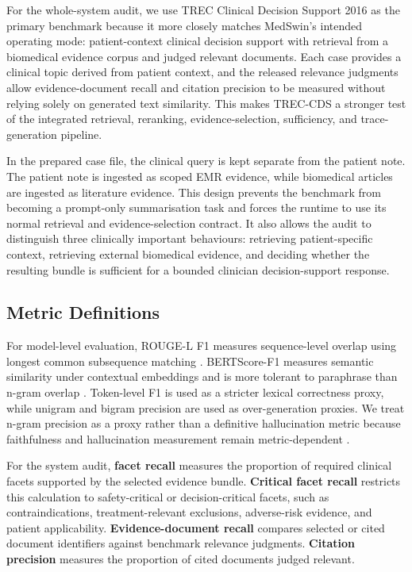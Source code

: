 \documentclass[conference]{IEEEtran}
\begin{document}
For the whole-system audit, we use TREC Clinical Decision Support 2016 as the primary benchmark because it more closely matches MedSwin's intended operating mode: patient-context clinical decision support with retrieval from a biomedical evidence corpus and judged relevant documents. Each case provides a clinical topic derived from patient context, and the released relevance judgments allow evidence-document recall and citation precision to be measured without relying solely on generated text similarity. This makes TREC-CDS a stronger test of the integrated retrieval, reranking, evidence-selection, sufficiency, and trace-generation pipeline.

In the prepared case file, the clinical query is kept separate from the patient note. The patient note is ingested as scoped EMR evidence, while biomedical articles are ingested as literature evidence. This design prevents the benchmark from becoming a prompt-only summarisation task and forces the runtime to use its normal retrieval and evidence-selection contract. It also allows the audit to distinguish three clinically important behaviours: retrieving patient-specific context, retrieving external biomedical evidence, and deciding whether the resulting bundle is sufficient for a bounded clinician decision-support response.


\subsection{Metric Definitions}
\label{app:metric-definitions}

For model-level evaluation, ROUGE-L F1 measures sequence-level overlap using longest common subsequence matching \cite{lin2004rouge}. BERTScore-F1 measures semantic similarity under contextual embeddings and is more tolerant to paraphrase than n-gram overlap \cite{bertscore}. Token-level F1 is used as a stricter lexical correctness proxy, while unigram and bigram precision are used as over-generation proxies. We treat n-gram precision as a proxy rather than a definitive hallucination metric because faithfulness and hallucination measurement remain metric-dependent \cite{maynez-etal-2020-faithfulness,ji2023hallucination,kulkarni-etal-2025-evaluating,mickus-etal-2024-semeval}.

For the system audit, \textbf{facet recall} measures the proportion of required clinical facets supported by the selected evidence bundle. \textbf{Critical facet recall} restricts this calculation to safety-critical or decision-critical facets, such as contraindications, treatment-relevant exclusions, adverse-risk evidence, and patient applicability. \textbf{Evidence-document recall} compares selected or cited document identifiers against benchmark relevance judgments. \textbf{Citation precision} measures the proportion of cited documents judged relevant.
\end{document}
